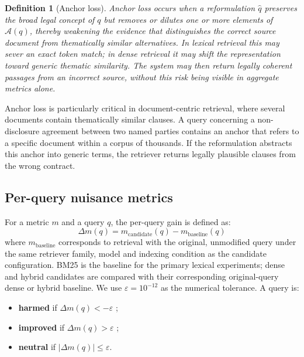 \documentclass[a4paper,fleqn]{cas-dc}
\newtheorem{definition}{Definition}
\begin{document}
\begin{definition}[Anchor loss]
Anchor loss occurs when a reformulation
$\hat{q}$ preserves the broad legal concept of $q$ but removes or
dilutes one or more elements of $\mathcal{A}(q)$, thereby weakening
the evidence that distinguishes the correct source document from
thematically similar alternatives. In lexical retrieval this may
sever an exact token match; in dense retrieval it may shift the
representation toward generic thematic similarity. The system may
then return legally coherent passages from an incorrect source,
without this risk being visible in aggregate metrics alone.
\end{definition}
 
Anchor loss is particularly critical in document-centric retrieval,
where several documents contain thematically similar clauses. A
query concerning a non-disclosure agreement between two named parties
contains an anchor that refers to a specific document within a corpus of thousands. If
the reformulation abstracts this anchor into generic terms, the retriever returns
legally plausible clauses from the wrong contract.
 
\subsection{Per-query nuisance metrics}
 
For a metric $m$ and a query $q$, the per-query gain is defined as:
\begin{equation}
    \Delta m(q) = m_{\text{candidate}}(q) - m_{\text{baseline}}(q)
\end{equation}
where $m_{\text{baseline}}$ corresponds to retrieval with the
original, unmodified query under the same retriever family, model
and indexing condition as the candidate configuration. BM25 is the
baseline for the primary lexical experiments; dense and hybrid
candidates are compared with their corresponding original-query
dense or hybrid baseline. We use $\varepsilon = 10^{-12}$ as
the numerical tolerance. A query is:
 
\begin{itemize}
    \item \textbf{harmed} if
          $\Delta m(q) < -\varepsilon$ ;
    \item \textbf{improved} if
          $\Delta m(q) > \varepsilon$ ;
    
\item \textbf{neutral} if
          $|\Delta m(q)| \leq \varepsilon$.
\end{itemize}
 
\end{document}
